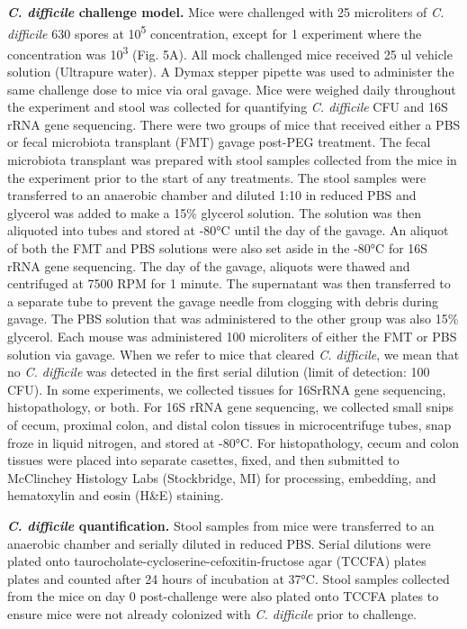 \documentclass[
  11pt,
]{article}
\begin{document}
\textbf{\emph{C. difficile} challenge model.} Mice were challenged with
25 microliters of \emph{C. difficile} 630 spores at
10\textsuperscript{5} concentration, except for 1 experiment where the
concentration was 10\textsuperscript{3} (Fig. 5A). All mock challenged
mice received 25 ul vehicle solution (Ultrapure water). A Dymax stepper
pipette was used to administer the same challenge dose to mice via oral
gavage. Mice were weighed daily throughout the experiment and stool was
collected for quantifying \emph{C. difficile} CFU and 16S rRNA gene
sequencing. There were two groups of mice that received either a PBS or
fecal microbiota transplant (FMT) gavage post-PEG treatment. The fecal
microbiota transplant was prepared with stool samples collected from the
mice in the experiment prior to the start of any treatments. The stool
samples were transferred to an anaerobic chamber and diluted 1:10 in
reduced PBS and glycerol was added to make a 15\% glycerol solution. The
solution was then aliquoted into tubes and stored at -80°C until the day
of the gavage. An aliquot of both the FMT and PBS solutions were also
set aside in the -80°C for 16S rRNA gene sequencing. The day of the
gavage, aliquots were thawed and centrifuged at 7500 RPM for 1 minute.
The supernatant was then transferred to a separate tube to prevent the
gavage needle from clogging with debris during gavage. The PBS solution
that was administered to the other group was also 15\% glycerol. Each
mouse was administered 100 microliters of either the FMT or PBS solution
via gavage. When we refer to mice that cleared \emph{C. difficile}, we
mean that no \emph{C. difficile} was detected in the first serial
dilution (limit of detection: 100 CFU). In some experiments, we
collected tissues for 16SrRNA gene sequencing, histopathology, or both.
For 16S rRNA gene sequencing, we collected small snips of cecum,
proximal colon, and distal colon tissues in microcentrifuge tubes, snap
froze in liquid nitrogen, and stored at -80°C. For histopathology, cecum
and colon tissues were placed into separate casettes, fixed, and then
submitted to McClinchey Histology Labs (Stockbridge, MI) for processing,
embedding, and hematoxylin and eosin (H\&E) staining.

\textbf{\emph{C. difficile} quantification.} Stool samples from mice
were transferred to an anaerobic chamber and serially diluted in reduced
PBS. Serial dilutions were plated onto
taurocholate-cycloserine-cefoxitin-fructose agar (TCCFA) plates plates
and counted after 24 hours of incubation at 37°C. Stool samples
collected from the mice on day 0 post-challenge were also plated onto
TCCFA plates to ensure mice were not already colonized with \emph{C.
difficile} prior to challenge.
\end{document}
